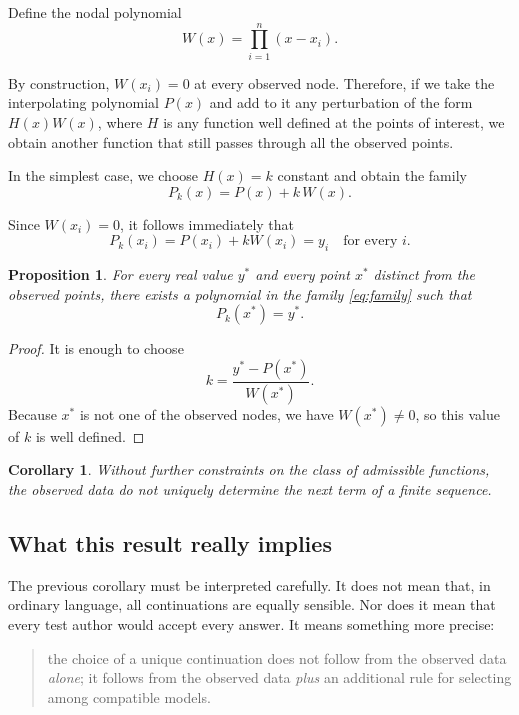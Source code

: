 \documentclass[10pt, a4paper]{article}
\theoremstyle{plain}
\newtheorem{proposition}{Proposition}
\newtheorem{corollary}{Corollary}
\theoremstyle{definition}
\theoremstyle{remark}
\begin{document}
Define the nodal polynomial
\begin{equation}
W(x)=\prod_{i=1}^{n}(x-x_i).
\label{eq:nodepoly}
\end{equation}

By construction, $W(x_i)=0$ at every observed node. Therefore, if we take the
interpolating polynomial $P(x)$ and add to it any perturbation of the form
$H(x)W(x)$, where $H$ is any function well defined at the points of interest, we
obtain another function that still passes through all the observed points.

In the simplest case, we choose $H(x)=k$ constant and obtain the family
\begin{equation}
P_k(x)=P(x)+k\,W(x).
\label{eq:family}
\end{equation}

Since $W(x_i)=0$, it follows immediately that
\[
P_k(x_i)=P(x_i)+kW(x_i)=y_i
\quad \text{for every } i.
\]

\begin{proposition}
For every real value $y^\ast$ and every point $x^\ast$ distinct from the
observed points, there exists a polynomial in the family \eqref{eq:family} such
that
\[
P_k(x^\ast)=y^\ast.
\]
\label{prop:anyvalue}
\end{proposition}

\begin{proof}
It is enough to choose
\[
k=\frac{y^\ast-P(x^\ast)}{W(x^\ast)}.
\]
Because $x^\ast$ is not one of the observed nodes, we have $W(x^\ast)\neq 0$,
so this value of $k$ is well defined.
\end{proof}

\begin{corollary}
Without further constraints on the class of admissible functions, the observed
data do not uniquely determine the next term of a finite sequence.
\end{corollary}

\subsection{What this result really implies}

The previous corollary must be interpreted carefully. It does not mean that, in
ordinary language, all continuations are equally sensible. Nor does it mean that
every test author would accept every answer. It means something more precise:

\begin{quote}
the choice of a unique continuation does not follow from the observed data
\emph{alone}; it follows from the observed data \emph{plus} an additional rule
for selecting among compatible models.
\end{quote}
\end{document}
